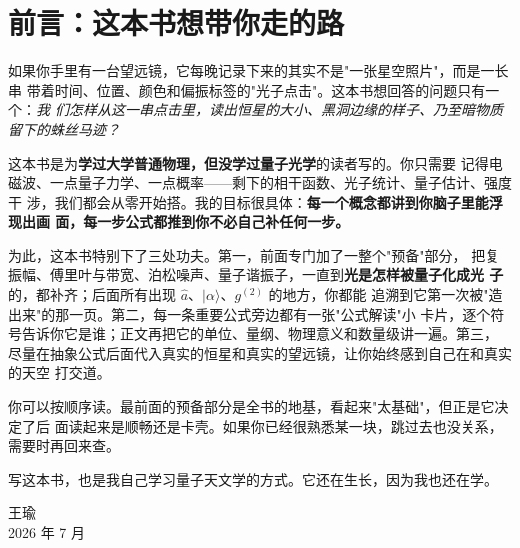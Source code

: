 \chapter*{前言：这本书想带你走的路}

如果你手里有一台望远镜，它每晚记录下来的其实不是"一张星空照片"，而是一长串
带着时间、位置、颜色和偏振标签的"光子点击"。这本书想回答的问题只有一个：\emph{我
们怎样从这一串点击里，读出恒星的大小、黑洞边缘的样子、乃至暗物质留下的蛛丝马迹？}

这本书是为\textbf{学过大学普通物理，但没学过量子光学}的读者写的。你只需要
记得电磁波、一点量子力学、一点概率——剩下的相干函数、光子统计、量子估计、强度干
涉，我们都会从零开始搭。我的目标很具体：\textbf{每一个概念都讲到你脑子里能浮现出画
面，每一步公式都推到你不必自己补任何一步。}

为此，这本书特别下了三处功夫。第一，前面专门加了一整个"预备"部分，
把复振幅、傅里叶与带宽、泊松噪声、量子谐振子，一直到\textbf{光是怎样被量子化成光
子}的，都补齐；后面所有出现 $\hat a$、$|\alpha\rangle$、$g^{(2)}$ 的地方，你都能
追溯到它第一次被"造出来"的那一页。第二，每一条重要公式旁边都有一张"公式解读"小
卡片，逐个符号告诉你它是谁；正文再把它的单位、量纲、物理意义和数量级讲一遍。第三，
尽量在抽象公式后面代入真实的恒星和真实的望远镜，让你始终感到自己在和真实的天空
打交道。

你可以按顺序读。最前面的预备部分是全书的地基，看起来"太基础"，但正是它决定了后
面读起来是顺畅还是卡壳。如果你已经很熟悉某一块，跳过去也没关系，需要时再回来查。

写这本书，也是我自己学习量子天文学的方式。它还在生长，因为我也还在学。

\begin{flushright}
王瑜\\
2026 年 7 月
\end{flushright}
